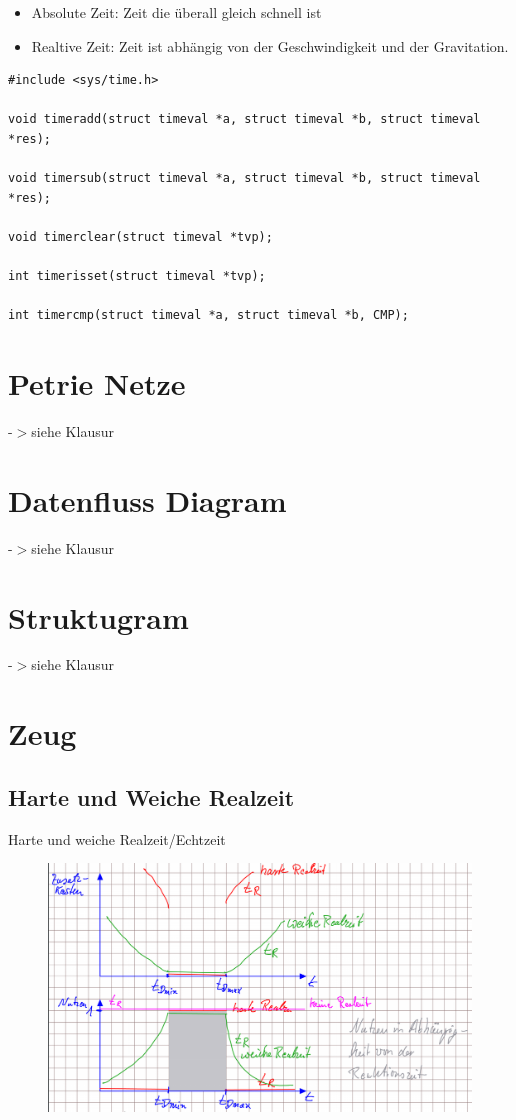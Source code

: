 \documentclass[12pt,a4paper,oneside,ngerman]{article}
\begin{document}
\begin{itemize}
	\item Absolute Zeit: Zeit die überall gleich schnell ist
	\item Realtive Zeit: Zeit ist abhängig von der Geschwindigkeit und der Gravitation.
\end{itemize}

\begin{lstlisting}
#include <sys/time.h>

void timeradd(struct timeval *a, struct timeval *b, struct timeval *res);

void timersub(struct timeval *a, struct timeval *b,	struct timeval *res);

void timerclear(struct timeval *tvp);

int timerisset(struct timeval *tvp);

int timercmp(struct timeval *a, struct timeval *b, CMP);
\end{lstlisting}


\section[Petrie Netze]{Petrie Netze}
-$>$siehe Klausur
\section[Datenfluss Diagram]{Datenfluss Diagram}
-$>$siehe Klausur
\section[Struktugram]{Struktugram}
-$>$siehe Klausur
\section[Zeug]{Zeug}
\subsection{Harte und Weiche Realzeit}
Harte und weiche Realzeit/Echtzeit\\
\begin{figure}[H]
	\centering
	\includegraphics[scale=0.3]{umlet/harte_weiche_realzeit.png}
\end{figure}
\end{document}
